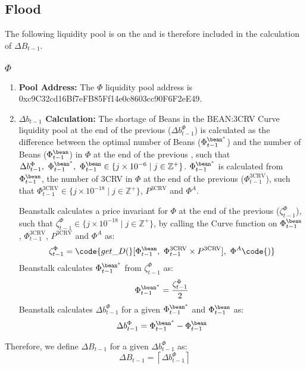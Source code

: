 \documentclass[class=article, crop=false]{standalone}
\begin{document}
\subsection{Flood}
The following liquidity pool is on the   and is therefore included in the calculation of $\Delta B_{t-1}$.
\subsubsection{$\Phi$}
    \begin{enumerate}
        \item \textbf{Pool Address:} The $\Phi$ liquidity pool address is 0xc9C32cd16Bf7eFB85Ff14e0c8603cc90F6F2eE49.
        \item \textbf{$\Delta b_{t-1}$ Calculation:} The shortage of Beans in the BEAN:3CRV Curve liquidity pool at the end of the previous  ($\Delta b_{t-1}^{\Phi}$) is calculated as the difference between the optimal number of Beans ($\Phi_{t-1}^{{\bean}^*}$) and the number of Beans ($\Phi_{t-1}^{\bean}$) in $\Phi$ at the end of the previous , such that $\Delta b_{t-1}^{\Phi},\ \Phi_{t-1}^{{\bean}^*},\ \Phi_{t-1}^{\bean} \in \{j \times 10^{-6} \mid j \in \mathbb{Z}^{+} \}$. $\Phi_{t-1}^{{\bean}^*}$ is calculated from $\Phi_{t-1}^{\bean}$, the number of 3CRV in $\Phi$ at the end of the previous  ($\Phi_{t-1}^{\text{3CRV}}$), such that $\Phi_{t-1}^{\text{3CRV}}\in \{j \times 10^{-18} \mid j \in \mathbb{Z}^{+} \}$, $P^{\text{3CRV}}$ and $\Phi^{A}$. 

Beanstalk calculates a price invariant for $\Phi$ at the end of the previous  ($\zeta^{\Phi}_{t-1}$), such that $\zeta^{\Phi}_{t-1}\in \{j \times 10^{-18} \mid j \in \mathbb{Z}^{+} \}$, by calling the Curve  function on $\Phi_{t-1}^{\bean}$, $\Phi_{t-1}^{\text{3CRV}}$, $P^{\text{3CRV}}$ and $\Phi^{A}$ as:
$$\zeta^{\Phi}_{t-1} = \code{get\_D(}[\Phi_{t-1}^{\bean},\ \Phi_{t-1}^{\text{3CRV}} \times P^{\text{3CRV}}],\ \Phi^{A}\code{)}$$
Beanstalk calculates $\Phi_{t-1}^{{\bean}^*}$ from $\zeta^{\Phi}_{t-1}$ as:
$$\Phi_{t-1}^{{\bean}^*} = \frac{\zeta^{\Phi}_{t-1}}{2}$$
Beanstalk calculates $\Delta b_{t-1}^{\Phi}$ for a given $\Phi_{t-1}^{{\bean}^*}$ and $\Phi_{t-1}^{\bean}$ as:
$$\Delta b_{t-1}^{\Phi} = \Phi_{t-1}^{{\bean}^*} - \Phi_{t-1}^{\bean}$$
    \end{enumerate}

Therefore, we define $\Delta B_{t-1}$ for a given $\Delta b_{t-1}^{\Phi}$ as:
$$\Delta B_{t-1} = \left\lceil\Delta b_{t-1}^{\Phi}\right\rceil$$
\end{document}
